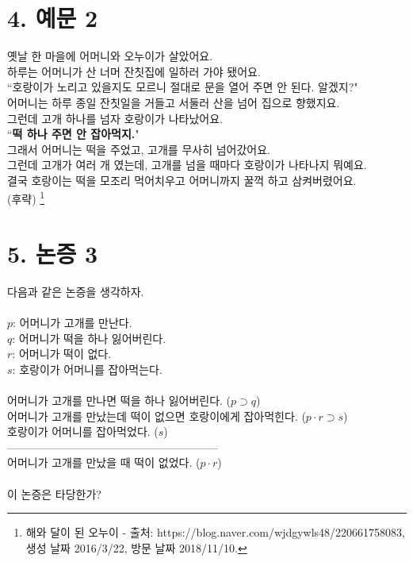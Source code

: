 \documentclass[12pt]{report}
\begin{document}
\section*{4. 예문 2}
옛날 한 마을에 어머니와 오누이가 살았어요.\\하루는 어머니가 산 너머 잔칫집에 일하러 가야 됐어요.\\
``호랑이가 노리고 있을지도 모르니 절대로 문을 열어 주면 안 된다. 알겠지?"\\
어머니는 하루 종일 잔칫일을 거들고 서둘러 산을 넘어 집으로 향했지요.\\그런데 고개 하나를 넘자 호랑이가 나타났어요.\\
``\textbf{떡 하나 주면 안 잡아먹지.}"\\
그래서 어머니는 떡을 주었고, 고개를 무사히 넘어갔어요.\\
그런데 고개가 여러 개 였는데, 고개를 넘을 때마다 호랑이가 나타나지 뭐예요.\\
결국 호랑이는 떡을 모조리 먹어치우고 어머니까지 꿀꺽 하고 삼켜버렸어요.\\
(후략) \footnote{해와 달이 된 오누이 - 출처: https://blog.naver.com/wjdgywls48/220661758083, 생성 날짜 2016/3/22, 방문 날짜 2018/11/10.}\\
\pagebreak

\section*{5. 논증 3}
다음과 같은 논증을 생각하자.\\~\\
$p$: 어머니가 고개를 만난다.\\
$q$: 어머니가 떡을 하나 잃어버린다.\\
$r$: 어머니가 떡이 없다.\\
$s$: 호랑이가 어머니를 잡아먹는다.\\~\\
어머니가 고개를 만나면 떡을 하나 잃어버린다. ($p \supset q$) \\
어머니가 고개를 만났는데 떡이 없으면 호랑이에게 잡아먹힌다. ($p\cdot r \supset s$)\\
호랑이가 어머니를 잡아먹었다. ($s$)\\
---------------------------------------------------------\\
어머니가 고개를 만났을 때 떡이 없었다. ($p\cdot r$)\\~\\
이 논증은 타당한가?
\end{document}
